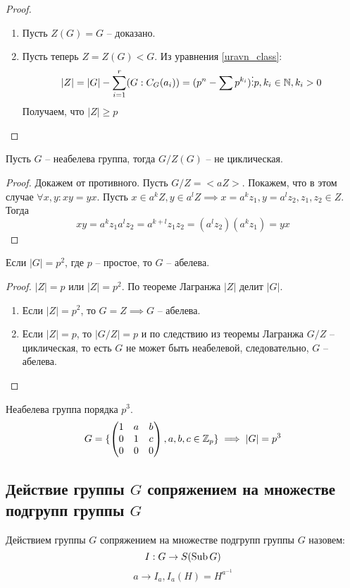 \begin{proof}
    \begin{enumerate}
        \item Пусть $Z(G) = G$ -- доказано.
        \item Пусть теперь $Z = Z(G) < G$. Из уравнения \ref{uravn_class}: $$|Z| = |G| - \sum\limits_{i = 1}^r(G: C_G(a_i)) = (p^n - \sum p^{k_i}) \vdots p, k_i \in \mathbb{N}, k_i > 0$$
        Получаем, что $|Z| \geq p$
    \end{enumerate}
\end{proof}

\begin{theorem}
    Пусть $G$ -- неабелева группа, тогда $G/Z(G)$ -- не циклическая.
\end{theorem}

\begin{proof}
    Докажем от противного. Пусть $G/Z = <aZ>$. Покажем, что в этом случае $\forall x, y: xy = yx$. Пусть $x \in a^kZ, y \in a^lZ \implies x = a^kz_1, y = a^lz_2, z_1, z_2 \in Z$. Тогда
    $$xy = a^kz_1a^lz_2 = a^{k + l}z_1z_2 = (a^lz_2)(a^kz_1) = yx$$
\end{proof}

\begin{corollary}
    Если $|G| = p^2$, где $p$ -- простое, то $G$ -- абелева.
\end{corollary}

\begin{proof}
    $|Z| = p$ или $|Z| = p^2$. По теореме Лагранжа $|Z|$ делит $|G|$.
    \begin{enumerate}
        \item Если $|Z| = p^2$, то $G = Z \implies G$ -- абелева.
        \item Если $|Z| = p$, то $|G/Z| = p$ и по следствию из теоремы Лагранжа $G/Z$ -- циклическая, то есть $G$ не может быть неабелевой, следовательно, $G$ -- абелева.
    \end{enumerate}
\end{proof}

\begin{example}
    Неабелева группа порядка $p^3$.
    $$G = \{
    \begin{pmatrix}
        1 & a & b\\
        0 & 1 & c\\
        0 & 0 & 0
    \end{pmatrix}, a, b, c \in \mathbb{Z}_p \} \implies |G| = p^3$$
\end{example}

\subsection{Действие группы $G$ сопряжением на множестве подгрупп группы $G$}
\begin{proposition}
    Действием группы $G$ сопряжением на множестве подгрупп группы $G$ назовем:
    $$I: G \to S(\operatorname{Sub} G)$$ 
    $$a \to I_a, I_a(H) = H^{a^{-1}}$$
\end{proposition}

